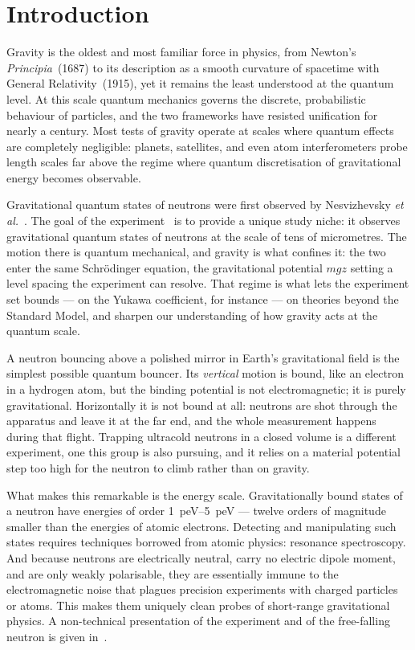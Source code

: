 \documentclass[a4paper,headsepline,oneside,11pt]{scrartcl}
\begin{document}
\section{Introduction}
\label{sec:introduction}
Gravity is the oldest and most familiar force in physics, from Newton's \emph{Principia}~(1687) to its description as a smooth curvature of spacetime with General Relativity~(1915), yet it remains the least understood at the quantum level.
At this scale quantum mechanics governs the discrete, probabilistic
behaviour of particles, and the two frameworks have resisted unification for
nearly a century.
Most tests of gravity operate at scales where quantum effects are
completely negligible: planets, satellites, and even atom
interferometers probe length scales far above the regime where quantum
discretisation of gravitational energy becomes observable.

Gravitational quantum states of neutrons were first observed by
Nesvizhevsky \emph{et al.}~\cite{Nesvizhevsky2002}.
The goal of the \qbounce{} experiment~\cite{Jenke2011, Cronenberg2018} is to provide a unique study niche: it observes gravitational quantum states of
neutrons at the scale of tens of micrometres. The motion there is quantum
mechanical, and gravity is what confines it: the two enter the same
Schr\"odinger equation, the gravitational potential $mgz$ setting a level
spacing the experiment can resolve. That regime is what lets the experiment set
bounds --- on the Yukawa coefficient, for
instance --- on theories beyond the Standard Model, and sharpen our understanding
of how gravity acts at the quantum scale.

A neutron bouncing above a polished mirror in Earth's gravitational
field is the simplest possible quantum bouncer. Its \emph{vertical} motion is
bound, like an electron in a hydrogen atom, but the binding potential is not
electromagnetic; it is purely gravitational. Horizontally it is not bound at
all: neutrons are shot through the apparatus and leave it at the far end, and
the whole measurement happens during that flight. Trapping ultracold neutrons in
a closed volume is a different experiment, one this group is also pursuing, and
it relies on a material potential step too high for the neutron to climb rather
than on gravity.

What makes this remarkable is the energy scale.
Gravitationally bound states of a neutron have energies of order
\SIrange{1}{5}{\pico\electronvolt} --- twelve orders of magnitude smaller than the energies of
atomic electrons.
Detecting and manipulating such states requires techniques borrowed
from atomic physics: resonance spectroscopy.
And because neutrons are electrically neutral, carry no electric
dipole moment, and are only weakly polarisable, they are essentially
immune to the electromagnetic noise that plagues precision experiments
with charged particles or atoms.
This makes them uniquely clean probes of short-range gravitational
physics. A non-technical presentation of the experiment and of the
free-falling neutron is given in~\cite{AbeleDeutschesMuseum}.
\end{document}
